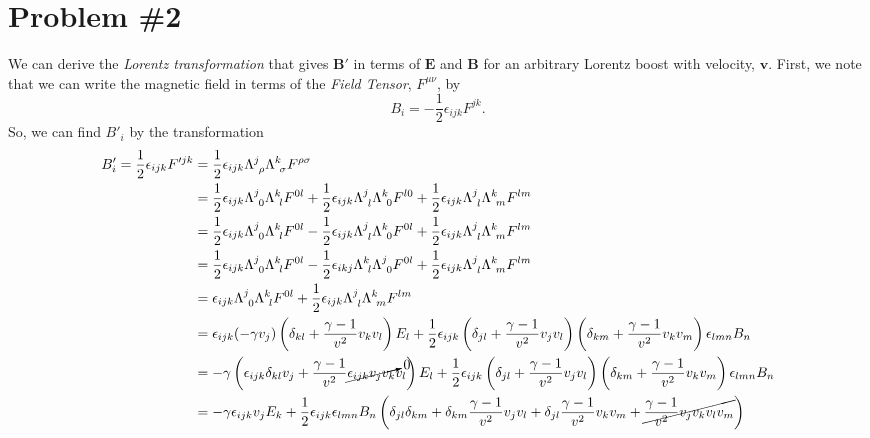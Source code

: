 \documentclass[11pt]{article}
\numberwithin{equation}{section}
\begin{document}
\section{Problem \#2}
    We can derive the \emph{Lorentz transformation} that gives $\mathbf{B'}$ in terms of $\mathbf{E}$ and $\mathbf{B}$ 
    for an arbitrary Lorentz boost with velocity, $\mathbf{v}$. First, we note that we can write the magnetic field
    in terms of the \emph{Field Tensor}, $F^{\mu\nu}$, by
    $$B_{i} = -\frac{1}{2}\epsilon_{ijk}F^{jk}.$$
    So, we can find $B'_{i}$ by the transformation
    \begin{align*}
        B'_{i} = \frac{1}{2}\epsilon_{ijk}F'^{jk} 
            &= \frac{1}{2}\epsilon_{ijk}\Lambda^{j}_{\ \rho}\Lambda^{k}_{\ \sigma}F^{\rho\sigma} \\
            &= \frac{1}{2}\epsilon_{ijk}\Lambda^{j}_{\ 0}\Lambda^{k}_{\ l}F^{0l}  + \frac{1}{2}\epsilon_{ijk}\Lambda^{j}_{\ l}\Lambda^{k}_{\ 0}F^{l0}  + \frac{1}{2}\epsilon_{ijk}\Lambda^{j}_{\ l}\Lambda^{k}_{\ m}F^{lm}\\
            &= \frac{1}{2}\epsilon_{ijk}\Lambda^{j}_{\ 0}\Lambda^{k}_{\ l}F^{0l}  - \frac{1}{2}\epsilon_{ijk}\Lambda^{j}_{\ l}\Lambda^{k}_{\ 0}F^{0l}  + \frac{1}{2}\epsilon_{ijk}\Lambda^{j}_{\ l}\Lambda^{k}_{\ m}F^{lm}\\
            &= \frac{1}{2}\epsilon_{ijk}\Lambda^{j}_{\ 0}\Lambda^{k}_{\ l}F^{0l}  - \frac{1}{2}\epsilon_{ikj}\Lambda^{k}_{\ l}\Lambda^{j}_{\ 0}F^{0l}  + \frac{1}{2}\epsilon_{ijk}\Lambda^{j}_{\ l}\Lambda^{k}_{\ m}F^{lm}\\
            &= \epsilon_{ijk}\Lambda^{j}_{\ 0}\Lambda^{k}_{\ l}F^{0l}  + \frac{1}{2}\epsilon_{ijk}\Lambda^{j}_{\ l}\Lambda^{k}_{\ m}F^{lm}\\
            &= \epsilon_{ijk}(-\gamma{v_j})\left(\delta_{kl}+\frac{\gamma-1}{v^2}v_{k}v_{l}\right)E_{l}  + \frac{1}{2}\epsilon_{ijk}\left(\delta_{jl}+\frac{\gamma-1}{v^2}v_{j}v_{l}\right)\left(\delta_{km}+\frac{\gamma-1}{v^2}v_{k}v_{m}\right)\epsilon_{lmn}B_{n}\\
            &= -\gamma\left(\epsilon_{ijk}\delta_{kl}v_j+\frac{\gamma-1}{v^2}\cancelto{0}{\epsilon_{ijk}v_jv_{k}}v_{l}\right)E_{l}  + \frac{1}{2}\epsilon_{ijk}\left(\delta_{jl}+\frac{\gamma-1}{v^2}v_{j}v_{l}\right)\left(\delta_{km}+\frac{\gamma-1}{v^2}v_{k}v_{m}\right)\epsilon_{lmn}B_{n}\\
            &= -\gamma\epsilon_{ijk}v_jE_{k} + \frac{1}{2}\epsilon_{ijk}\epsilon_{lmn}B_{n}\left(\delta_{jl}\delta_{km}+\delta_{km}\frac{\gamma-1}{v^2}v_{j}v_{l} + \delta_{jl}\frac{\gamma-1}{v^2}v_{k}v_{m} + \cancel{\frac{\gamma-1}{v^2}v_{j}v_{k}v_{l}v_{m}}\right)\\

\end{align*}
\end{document}
